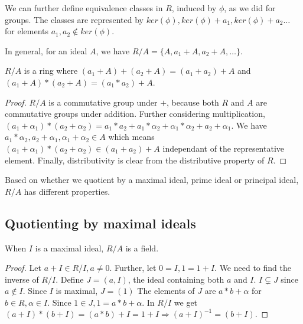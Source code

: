 We can further define equivalence classes in $R$, induced by $\phi$, as we did for groups.
The classes are represented by $ker(\phi), ker(\phi) + a_{1}, ker(\phi) + a_{2} \dots $ for elements $a_{1}, a_{2} \not \in ker(\phi)$.
\par
In general, for an ideal $A$, we have $R \big/ A = \{ A, a_{1} + A, a_{2} + A, \dots \}$.
\begin{lemma} \label{lem:quotient}
  $R \big/ A$ is a ring where $(a_{1} + A) + (a_{2} + A) = (a_{1} + a_{2}) + A$ and $(a_{1} + A) * (a_{2} + A) = (a_{1} * a_{2}) + A$.
\end{lemma}
\begin{proof} \label{proof:quotient}
  $ R \big/ A$ is a commutative group under $+$, because both $R$ and $A$ are commutative groups under addition.
  Further considering multiplication, $(a_{1} + \alpha_{1}) * (a_{2} + \alpha_{2}) = a_{1} * a_{2} + a_{1} * \alpha_{2} + \alpha_{1} * \alpha_{2} + a_{2} + \alpha_{1}$.
  We have $a_{1} * \alpha_{2}, a_{2} + \alpha_{1}, \alpha_{1} + \alpha_{2} \in A$ which means $(a_{1} + \alpha_{1}) * (a_{2} + \alpha_{2}) \in (a_{1} + a_{2}) + A$ independant of the representative element.
  Finally, distributivity is clear from the distributive property of $R$.
\end{proof}
Based on whether we quotient by a maximal ideal, prime ideal or principal ideal, $R \big/ A$ has different properties.
\subsection{Quotienting by maximal ideals}
\begin{lemma} \label{lem:maximalquotient}
  When $I$ is a maximal ideal, $R \big/ A$ is a field.
\end{lemma}
\begin{proof} \label{proof:maximalquotient}
  Let $a + I \in R \big/ I, a \neq 0$.
  Further, let $0 = I, 1 = 1 + I$.
  We need to find the inverse of $R \big/ I$.
  Define $J = (a, I)$, the ideal containing both $a$ and $I$.
  $I \subsetneq J$ since $a \not \in I$.
  Since $I$ is maximal, $J = (1)$
  The elements of $J$ are $a * b + \alpha$ for $b \in R, \alpha \in I$.
  Since $1 \in J, 1 = a * b + \alpha$.
  In $R \big/ I$ we get $(a + I) * (b + I) = (a * b) + I = 1 + I \Rightarrow (a + I)^{-1} = (b + I)$.
\end{proof}
